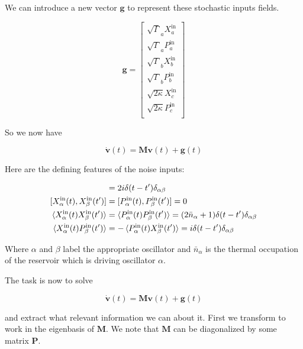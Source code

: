 \documentclass[12pt]{article}
\newcommand{\bv}[1]{\boldsymbol{#1}}
\begin{document}
We can introduce a new vector $\bv{g}$ to represent these stochastic inputs fields.

\begin{equation}
\bv{g} = \begin{bmatrix}
\sqrt{\Gamma}_a X_a^{\text{in}}\\
\sqrt{\Gamma}_a P_a^{\text{in}}\\
\sqrt{\Gamma}_b X_b^{\text{in}}\\
\sqrt{\Gamma}_b P_b^{\text{in}}\\
\sqrt{2\kappa} X_c^{\text{in}}\\
\sqrt{2\kappa} P_c^{\text{in}}\\
\end{bmatrix}
\end{equation}

So we now have

\[
\dot{\bv{v}}(t) = \bv{M} \bv{v}(t) + \bv{g}(t)
\]

Here are the defining features of the noise inputs:

\begin{align*}
[X_{\alpha}^{\text{in}}(t),P_{\beta}^{\text{in}}(t')] &= 2i\delta(t-t')\delta_{\alpha \beta}\\
[X_{\alpha}^{\text{in}}(t),X_{\beta}^{\text{in}}(t')]& = [P_{\alpha}^{\text{in}}(t),P_{\beta}^{\text{in}}(t')] = 0\\
\braket{X_{\alpha}^{\text{in}}(t)X_{\beta}^{\text{in}}(t')} &= \braket{P_{\alpha}^{\text{in}}(t)P_{\beta}^{\text{in}}(t')} = (2\bar{n}_{\alpha} +1)\delta(t-t')\delta_{\alpha \beta}\\
\braket{X_{\alpha}^{\text{in}}(t)P_{\beta}^{\text{in}}(t')} &= -\braket{P_{\alpha}^{\text{in}}(t)X_{\beta}^{\text{in}}(t')} = i\delta(t-t')\delta_{\alpha \beta}
\end{align*}

Where $\alpha$ and $\beta$ label the appropriate oscillator and $\bar{n}_{\alpha}$ is the thermal occupation of the reservoir which is driving oscillator $\alpha$.

The task is now to solve

\begin{equation}
\dot{\bv{v}}(t) = \bv{M} \bv{v}(t) + \bv{g}(t)
\label{main}
\end{equation}

and extract what relevant information we can about it. First we transform to work in the eigenbasis of $\bv{M}$. We note that $\bv{M}$ can be diagonalized by some matrix $\bv{P}$.
\end{document}
